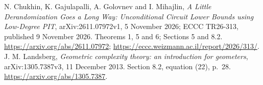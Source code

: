  N. Chukhin, K. Gajulapalli, A. Golovnev and I. Mihajlin, \emph{A Little Derandomization Goes a Long Way: Unconditional Circuit Lower Bounds using Low-Degree PIT}, arXiv:2611.07972v1, 5 November 2026; ECCC TR26-313, published 9 November 2026. Theorems 1, 5 and 6; Sections 5 and 8.2. \url{https://arxiv.org/abs/2611.07972}; \url{https://eccc.weizmann.ac.il/report/2026/313/}.
 J. M. Landsberg, \emph{Geometric complexity theory: an introduction for geometers}, arXiv:1305.7387v3, 11 December 2013. Section 8.2, equation (22), p.~28. \url{https://arxiv.org/abs/1305.7387}.
